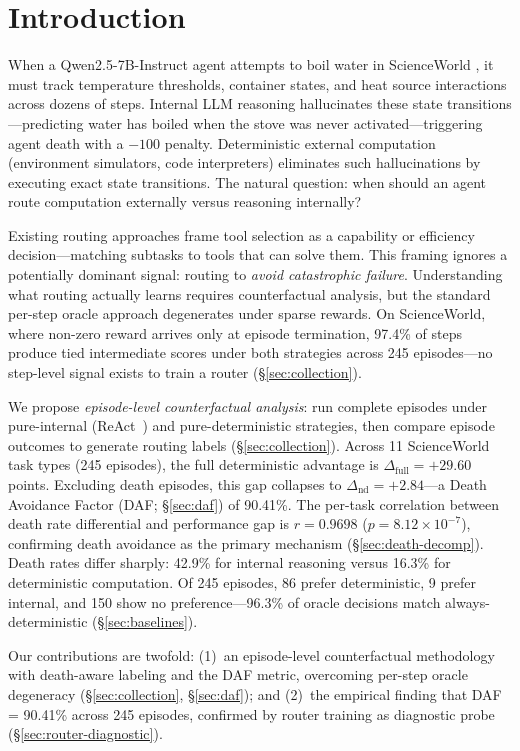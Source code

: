 \section{Introduction}

When a Qwen2.5-7B-Instruct agent attempts to boil water in ScienceWorld \cite{scienceworld-2022}, it must track temperature thresholds, container states, and heat source interactions across dozens of steps. Internal LLM reasoning hallucinates these state transitions---predicting water has boiled when the stove was never activated---triggering agent death with a $-100$ penalty. Deterministic external computation (environment simulators, code interpreters) eliminates such hallucinations by executing exact state transitions. The natural question: when should an agent route computation externally versus reasoning internally?

Existing routing approaches \cite{toolformer-2024,art-2023,chameleon-2024} frame tool selection as a capability or efficiency decision---matching subtasks to tools that can solve them. This framing ignores a potentially dominant signal: routing to \emph{avoid catastrophic failure}. Understanding what routing actually learns requires counterfactual analysis, but the standard per-step oracle approach degenerates under sparse rewards. On ScienceWorld, where non-zero reward arrives only at episode termination, 97.4\% of steps produce tied intermediate scores under both strategies across 245 episodes---no step-level signal exists to train a router (\S\ref{sec:collection}).

We propose \emph{episode-level counterfactual analysis}: run complete episodes under pure-internal (ReAct~\cite{react-2023}) and pure-deterministic strategies, then compare episode outcomes to generate routing labels (\S\ref{sec:collection}). Across 11 ScienceWorld task types (245 episodes), the full deterministic advantage is $\Delta_{\text{full}} = +29.60$ points. Excluding death episodes, this gap collapses to $\Delta_{\text{nd}} = +2.84$---a Death Avoidance Factor (DAF; \S\ref{sec:daf}) of 90.41\%. The per-task correlation between death rate differential and performance gap is $r = 0.9698$ ($p = 8.12 \times 10^{-7}$), confirming death avoidance as the primary mechanism (\S\ref{sec:death-decomp}). Death rates differ sharply: 42.9\% for internal reasoning versus 16.3\% for deterministic computation. Of 245 episodes, 86 prefer deterministic, 9 prefer internal, and 150 show no preference---96.3\% of oracle decisions match always-deterministic (\S\ref{sec:baselines}).

Our contributions are twofold: (1)~an episode-level counterfactual methodology with death-aware labeling and the DAF metric, overcoming per-step oracle degeneracy (\S\ref{sec:collection}, \S\ref{sec:daf}); and (2)~the empirical finding that DAF = 90.41\% across 245 episodes, confirmed by router training as diagnostic probe (\S\ref{sec:router-diagnostic}).
